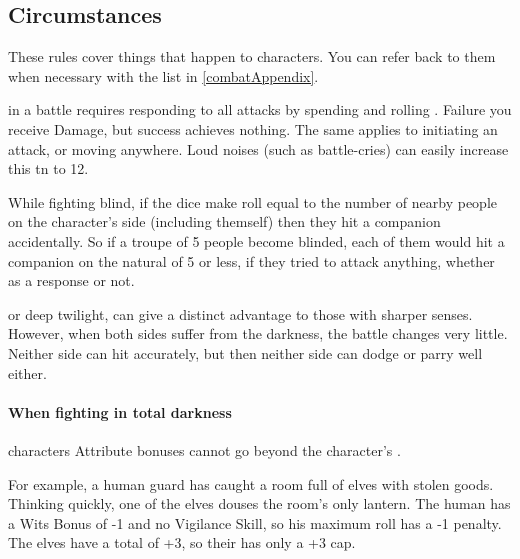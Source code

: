 \begin{multicols}{2}

\subsection{Circumstances}

These rules cover things that happen to characters.
You can refer back to them when necessary with the list in \autoref{combatAppendix}.

in a battle requires responding to all attacks by spending  and rolling .
Failure you receive Damage, but success achieves nothing.
The same applies to initiating an attack, or moving anywhere.
Loud noises (such as battle-cries) can easily increase this \gls{tn} to 12.

While fighting blind, if the dice make  roll equal to the number of nearby people on the character's side (including themself) then they hit a companion accidentally.
So if a troupe of 5 people become blinded, each of them would hit a companion on the \gls{natural} of 5 or less, if they tried to attack anything, whether as a response or not.

\label{darkness}
or deep twilight, can give a distinct advantage to those with sharper senses.
However, when both sides suffer from the darkness, the battle changes very little.
Neither side can hit accurately, but then neither side can dodge or parry well either.

\paragraph*{When fighting in total darkness}
characters Attribute bonuses cannot go beyond the character's .

\begin{exampletext}
  For example, a human guard has caught a room full of elves with stolen goods.
  Thinking quickly, one of the elves douses the room's only lantern.
  The human has a Wits Bonus of -1 and no Vigilance Skill, so his maximum roll has a -1 penalty.
  The elves have a total  of +3, so their  has only a +3 cap.
\end{exampletext}


\end{multicols}
